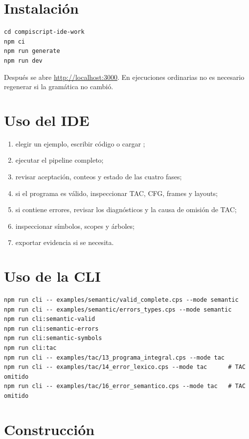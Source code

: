 \documentclass[11pt,letterpaper,oneside]{report}
\newcommand{\archivo}[1]{\path{#1}}
\begin{document}
\section{Instalación}

\begin{verbatim}
cd compiscript-ide-work
npm ci
npm run generate
npm run dev
\end{verbatim}

Después se abre \url{http://localhost:3000}. En ejecuciones ordinarias no es necesario
regenerar si la gramática no cambió.

\section{Uso del IDE}

\begin{enumerate}
  \item elegir un ejemplo, escribir código o cargar \archivo{.cps};
  \item ejecutar el pipeline completo;
  \item revisar aceptación, conteos y estado de las cuatro fases;
  \item si el programa es válido, inspeccionar TAC, CFG, frames y layouts;
  \item si contiene errores, revisar los diagnósticos y la causa de omisión de TAC;
  \item inspeccionar símbolos, scopes y árboles;
  \item exportar evidencia si se necesita.
\end{enumerate}

\section{Uso de la CLI}

\begin{verbatim}
npm run cli -- examples/semantic/valid_complete.cps --mode semantic
npm run cli -- examples/semantic/errors_types.cps --mode semantic
npm run cli:semantic-valid
npm run cli:semantic-errors
npm run cli:semantic-symbols
npm run cli:tac
npm run cli -- examples/tac/13_programa_integral.cps --mode tac
npm run cli -- examples/tac/14_error_lexico.cps --mode tac      # TAC omitido
npm run cli -- examples/tac/16_error_semantico.cps --mode tac   # TAC omitido
\end{verbatim}

\section{Construcción}
\end{document}
